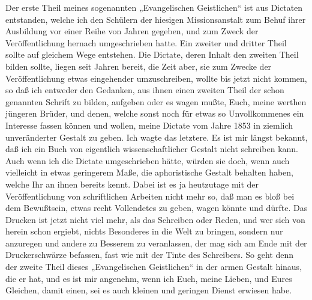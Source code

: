 \clearpage
Der erste Theil meines sogenannten „Evangelischen Geistlichen“ ist aus Dictaten entstanden, welche ich den Schülern der hiesigen Missionsanstalt zum Behuf ihrer Ausbildung vor einer Reihe von Jahren gegeben, und zum Zweck der Veröffentlichung hernach umgeschrieben hatte. Ein zweiter und dritter Theil sollte auf gleichem Wege entstehen. Die Dictate, deren Inhalt den zweiten Theil bilden sollte, liegen seit Jahren bereit, die Zeit aber, sie zum Zwecke der Veröffentlichung etwas eingehender umzuschreiben, wollte bis jetzt nicht kommen, so daß ich entweder den Gedanken, aus ihnen einen zweiten Theil der schon genannten Schrift zu bilden, aufgeben oder es wagen mußte, Euch, meine werthen jüngeren Brüder, und denen, welche sonst noch für etwas so Unvollkommenes ein Interesse fassen können und wollen, meine Dictate vom Jahre 1853 in ziemlich unveränderter Gestalt zu geben. Ich wagte das letztere. Es ist mir längst bekannt, daß ich ein Buch von eigentlich wissenschaftlicher Gestalt nicht schreiben kann. Auch wenn ich die Dictate umgeschrieben hätte, würden sie doch, wenn auch vielleicht in etwas geringerem Maße, die aphoristische Gestalt behalten haben, welche Ihr an ihnen bereits kennt. Dabei ist es ja heutzutage mit der Veröffentlichung von schriftlichen Arbeiten nicht mehr so, daß man es bloß bei dem Bewußtsein, etwas recht Vollendetes zu geben, wagen könnte und dürfte. Das Drucken ist jetzt nicht viel mehr, als das Schreiben oder Reden, und wer sich von herein schon ergiebt, nichts Besonderes in die Welt zu bringen, sondern nur anzuregen und andere zu Besserem zu veranlassen, der mag sich am Ende mit der Druckerschwärze befassen, fast wie mit der Tinte des Schreibers. So geht denn der zweite
Theil dieses „Evangelischen Geistlichen“ in der armen Gestalt hinaus, die er hat, und es ist mir angenehm, wenn ich Euch, meine Lieben, und Eures Gleichen, damit einen, sei es auch kleinen und geringen Dienst erwiesen habe.

